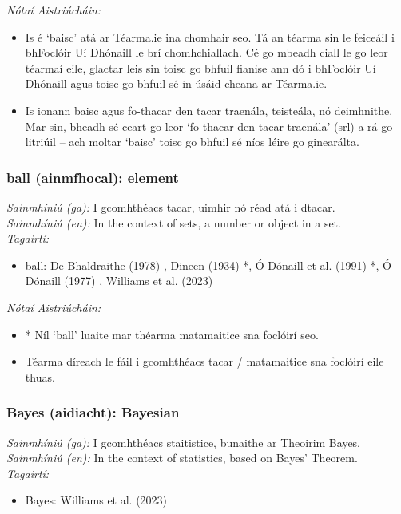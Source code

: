 \documentclass{article}
\begin{document}
 \noindent \textit{Nótaí Aistriúcháin:}
\begin{itemize}
	\item Is é `baisc' atá ar Téarma.ie ina chomhair seo. Tá an téarma sin le feiceáil i bhFoclóir Uí Dhónaill le brí chomhchiallach. Cé go mbeadh ciall le go leor téarmaí eile, glactar leis sin toisc go bhfuil fianise ann dó i bhFoclóir Uí Dhónaill agus toisc go bhfuil sé in úsáid cheana ar Téarma.ie.
	\item Is ionann baisc agus fo-thacar den tacar traenála, teisteála, nó deimhnithe. Mar sin, bheadh sé ceart go leor `fo-thacar den tacar traenála' (srl) a rá go litriúil -- ach moltar `baisc' toisc go bhfuil sé níos léire go ginearálta.
\end{itemize}


\subsubsection*{ball (ainmfhocal): element}
 \noindent \textit{Sainmhíniú (ga):} I gcomhthéacs tacar, uimhir nó réad atá i dtacar.
\\
 \noindent \textit{Sainmhíniú (en):} In the context of sets, a number or object in a set.
\\
 \noindent \textit{Tagairtí:}
\begin{itemize}
	\item ball: De Bhaldraithe (1978) \cite{de-bhaldraithe}, Dineen (1934) \cite{dineen}*, Ó Dónaill et al. (1991) \cite{focloir-beag}*, Ó Dónaill (1977) \cite{odonaill}, Williams et al. (2023) \cite{storchiste}
\end{itemize}

 \noindent \textit{Nótaí Aistriúcháin:}
\begin{itemize}
	\item * Níl `ball' luaite mar théarma matamaitice sna foclóirí seo.
	\item Téarma díreach le fáil i gcomhthéacs tacar / matamaitice sna foclóirí eile thuas.
\end{itemize}


\subsubsection*{Bayes (aidiacht): Bayesian}
 \noindent \textit{Sainmhíniú (ga):} I gcomhthéacs staitistice, bunaithe ar Theoirim Bayes.
\\
 \noindent \textit{Sainmhíniú (en):} In the context of statistics, based on Bayes' Theorem.
\\
 \noindent \textit{Tagairtí:}
\begin{itemize}
	\item Bayes: Williams et al. (2023) \cite{storchiste}
\end{itemize}
\end{document}
